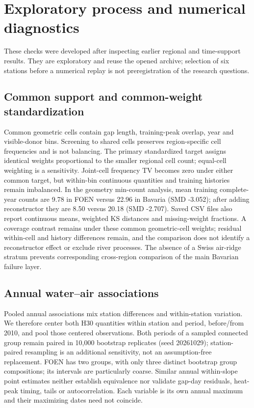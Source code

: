\section{Exploratory process and numerical diagnostics}
These checks were developed after inspecting earlier regional and time-support results. They are exploratory and reuse the opened archive; selection of six stations before a numerical replay is not preregistration of the research questions.

\subsection{Common support and common-weight standardization}
Common geometric cells contain gap length, training-peak overlap, year and visible-donor bins. Screening to shared cells preserves region-specific cell frequencies and is not balancing. The primary standardized target assigns identical weights proportional to the smaller regional cell count; equal-cell weighting is a sensitivity. Joint-cell frequency TV becomes zero under either common target, but within-bin continuous quantities and training histories remain imbalanced. In the geometry min-count analysis, mean training complete-year counts are 9.78 in FOEN versus 22.96 in Bavaria (SMD -3.052); after adding reconstructor they are 8.50 versus 20.18 (SMD -2.707). Saved CSV files also report continuous means, weighted KS distances and missing-weight fractions. A coverage contrast remains under these common geometric-cell weights; residual within-cell and history differences remain, and the comparison does not identify a reconstructor effect or exclude river processes. The absence of a Swiss air-ridge stratum prevents corresponding cross-region comparison of the main Bavarian failure layer.




\subsection{Annual water--air associations}
Pooled annual associations mix station differences and within-station variation. We therefore center both H30 quantities within station and period, before/from 2010, and pool those centered observations. Both periods of a sampled connected group remain paired in 10,000 bootstrap replicates (seed 20261029); station-paired resampling is an additional sensitivity, not an assumption-free replacement. FOEN has two groups, with only three distinct bootstrap group compositions; its intervals are particularly coarse. Similar annual within-slope point estimates neither establish equivalence nor validate gap-day residuals, heat-peak timing, tails or autocorrelation. Each variable is its own annual maximum and their maximizing dates need not coincide.




